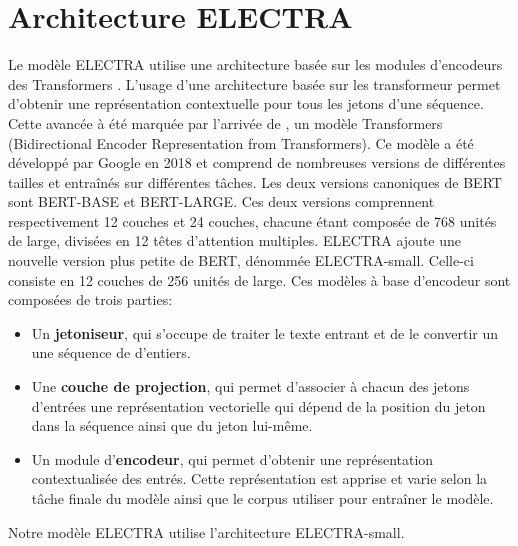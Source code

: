\documentclass[12pt,twoside,maitrise]{dms}
\theoremstyle{definition}
\numberwithin{equation}{section}
\numberwithin{table}{chapter}
\numberwithin{figure}{chapter}
\begin{document}
\section{Architecture ELECTRA}
Le modèle ELECTRA utilise une architecture basée sur les modules d'encodeurs
des Transformers \cite{vaswani2023attentionneed}. L'usage d'une architecture
basée sur les transformeur permet d'obtenir une représentation contextuelle
pour tous les jetons d'une séquence. Cette avancée à été marquée par l'arrivée
de \cite{bert},  un modèle Transformers (Bidirectional Encoder Representation
from Transformers). Ce modèle a été développé par Google en 2018 et comprend de
nombreuses versions de différentes tailles et entraînés sur différentes tâches.
Les deux versions canoniques de BERT sont BERT-BASE et BERT-LARGE. Ces deux
versions comprennent respectivement 12 couches et 24 couches, chacune étant
composée de 768 unités de large, divisées en 12 têtes d’attention multiples.
ELECTRA ajoute une nouvelle version plus petite de BERT, dénommée
ELECTRA-small. Celle-ci consiste en 12 couches de 256 unités de large. Ces
modèles à base d'encodeur sont composées de trois parties:
\begin{itemize}
	\item Un \textbf{jetoniseur}, qui s'occupe de traiter le texte entrant et
	      de le convertir un une séquence de d'entiers.
	\item Une \textbf{couche de projection}, qui permet d'associer à chacun des
	      jetons d'entrées une représentation vectorielle qui dépend de la
	      position du jeton dans la séquence ainsi que du jeton lui-même.
	\item Un module d'\textbf{encodeur}, qui permet d'obtenir une
	      représentation contextualisée des entrés. Cette représentation est
	      apprise et varie selon la tâche finale du modèle ainsi que le corpus
	      utiliser pour entraîner le modèle.
\end{itemize}
Notre modèle ELECTRA utilise l'architecture ELECTRA-small.
\end{document}
